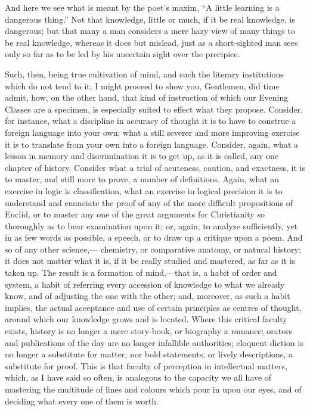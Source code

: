 And here we see what is meant by the poet's maxim, ``A little
learning is a dangerous thing.'' Not that knowledge, little or
much, if it be real knowledge, is dangerous; but that many a man
considers a mere hazy view of many things to be real knowledge,
whereas it does but mislead, just as a short-sighted man sees only so
far as to be led by his uncertain sight over the precipice.

Such, then, being true cultivation of mind, and such the literary
institutions which do not tend to it, I might proceed to show you,
Gentlemen, did time admit, how, on the other hand, that kind of
instruction of which our Evening Classes are a specimen, is especially
suited to effect what they propose. Consider, for instance, what a
discipline in accuracy of thought it is to have to construe a foreign
language into your own; what a still severer and more improving
exercise it is to translate from your own into a foreign language.
Consider, again, what a lesson in memory and discrimination it is to
get up, as it is called, any one chapter of history. Consider what a
trial of acuteness, caution, and exactness, it is to master, and still
more to prove, a number of definitions. Again, what an exercise in
logic is classification, what an exercise in logical precision it is
to understand and enunciate the proof of any of the more difficult
propositions of Euclid, or to master any one of the great arguments
for Christianity so thoroughly as to bear examination upon it; or,
again, to analyze sufficiently, yet in as few words as possible, a
speech, or to draw up a critique upon a poem. And so of any other
science,— chemistry, or comparative anatomy, or natural
history; it does not matter what it is, if it be really studied and
mastered, as far as it is taken up. The result is a formation of mind,—that
is, a habit of order and system, a habit of referring every accession
of knowledge to what we already know, and of adjusting the one with
the other; and, moreover, as such a habit implies, the actual
acceptance and use of certain principles as centres of thought, around
which our knowledge grows and is located. Where this critical faculty
exists, history is no longer a mere story-book, or biography a
romance; orators and publications of the day are no longer infallible
authorities; eloquent diction is no longer a substitute for matter,
nor bold statements, or lively descriptions, a substitute for proof.
This is that faculty of perception in intellectual matters, which, as
I have said so often, is analogous to the capacity we all have of
mastering the multitude of lines and colours which pour in upon our
eyes, and of deciding what every one of them is worth.

